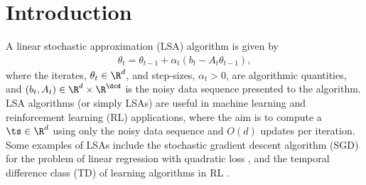 \section{Introduction}
A linear stochastic approximation (LSA) algorithm is given by
\begin{align}\label{eq:lsaintro}
\theta_t=\theta_{t-1}+\alpha_t (b_t-A_t \theta_{t-1}),
\end{align}
where the iterates, $\theta_t\in \R^d$, and step-sizes, $\alpha_t>0$, are algorithmic quantities, and $(b_t,A_t)\in \R^d\times \R^{\dcd}$ is the noisy data sequence presented to the algorithm.
LSA algorithms (or simply LSAs) are useful in machine learning and reinforcement learning (RL) applications, where the aim is to compute a $\ts\in \R^d$ using only the noisy data sequence and $O(d)$ updates per iteration. Some examples of LSAs include the stochastic gradient descent algorithm (SGD) for the problem of linear regression with quadratic loss \cite{bach,bachaistats}, and the temporal difference class (TD) of learning algorithms in RL \cite{sutton,konda-tsitsiklis,gtd,gtd2,gtdmp}.\par

